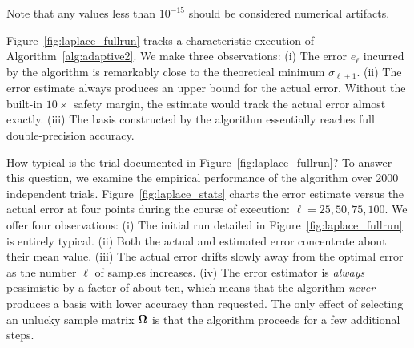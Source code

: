 \documentclass[final]{siamltex}
\newcounter{algorithm}[section]
\begin{document}
\lsp

\noindent
Note that any values less than $10^{-15}$ should be considered numerical artifacts.

Figure~\ref{fig:laplace_fullrun} tracks a characteristic execution
of Algorithm~\ref{alg:adaptive2}.  We make three observations:
(i) The error $e_{\ell}$ incurred by the algorithm is remarkably
close to the theoretical minimum $\sigma_{\ell+1}$.
(ii) The error estimate always produces an upper bound for the actual error.
Without the built-in $10\times$ safety margin, the estimate would track
the actual error almost exactly.
(iii) The basis constructed by the algorithm essentially reaches
full double-precision accuracy.

How typical is the trial documented in Figure~\ref{fig:laplace_fullrun}?
To answer this question, we examine the empirical performance
of the algorithm over 2000 independent trials.
Figure~\ref{fig:laplace_stats} charts the error estimate versus
the actual error at four points during the course of execution:
$\ell = 25, 50, 75, 100$.  We offer four observations:
(i) The initial run detailed in Figure~\ref{fig:laplace_fullrun}
is entirely typical.
(ii) Both the actual and estimated error concentrate about their
mean value.
(iii) The actual error drifts slowly away from the optimal error
as the number $\ell$ of samples increases.
(iv) The error estimator is \emph{always} pessimistic by a factor
of about ten, which means that the algorithm \emph{never} produces
a basis with lower accuracy than requested.  The only effect of
selecting an unlucky sample matrix $\bm{\Omega}$ is that the
algorithm proceeds for a few additional steps.


\end{document}
